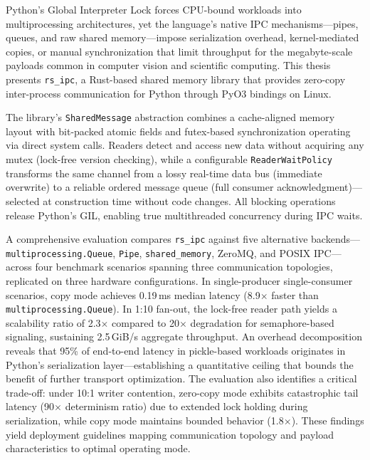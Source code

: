 \documentclass[12pt]{report}
\begin{document}
Python's Global Interpreter Lock forces CPU-bound workloads into multiprocessing architectures, yet the language's native IPC mechanisms---pipes, queues, and raw shared memory---impose serialization overhead, kernel-mediated copies, or manual synchronization that limit throughput for the megabyte-scale payloads common in computer vision and scientific computing. This thesis presents \texttt{rs\_ipc}, a Rust-based shared memory library that provides zero-copy inter-process communication for Python through PyO3 bindings on Linux.

The library's \texttt{SharedMessage} abstraction combines a cache-aligned memory layout with bit-packed atomic fields and futex-based synchronization operating via direct system calls. Readers detect and access new data without acquiring any mutex (lock-free version checking), while a configurable \texttt{ReaderWaitPolicy} transforms the same channel from a lossy real-time data bus (immediate overwrite) to a reliable ordered message queue (full consumer acknowledgment)---selected at construction time without code changes. All blocking operations release Python's GIL, enabling true multithreaded concurrency during IPC waits.

A comprehensive evaluation compares \texttt{rs\_ipc} against five alternative backends---\texttt{multiprocessing.Queue}, \texttt{Pipe}, \texttt{shared\_memory}, ZeroMQ, and POSIX IPC---across four benchmark scenarios spanning three communication topologies, replicated on three hardware configurations.
In single-producer single-consumer scenarios, copy mode achieves 0.19\,ms median latency (8.9$\times$ faster than \texttt{multiprocessing\allowbreak.Queue}). In 1:10 fan-out, the lock-free reader path yields a scalability ratio of 2.3$\times$ compared to 20$\times$ degradation for semaphore-based signaling, sustaining 2.5\,GiB/s aggregate throughput.
An overhead decomposition reveals that 95\% of end-to-end latency in pickle-based workloads originates in Python's serialization layer---establishing a quantitative ceiling that bounds the benefit of further transport optimization. The evaluation also identifies a critical trade-off: under 10:1 writer contention, zero-copy mode exhibits catastrophic tail latency (90$\times$ determinism ratio) due to extended lock holding during serialization, while copy mode maintains bounded behavior (1.8$\times$). These findings yield deployment guidelines mapping communication topology and payload characteristics to optimal operating mode.


\tableofcontents


\newpage
{}











\end{document}
